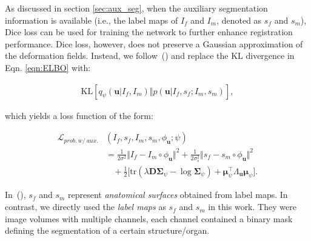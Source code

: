 \documentclass[times,twocolumn,final]{elsarticle}
\begin{document}
As discussed in section \ref{sec:aux_seg}, when the auxiliary segmentation information is available (i.e., the label maps of $I_f$ and $I_m$, denoted as $s_f$ and $s_m$), Dice loss can be used for training the network to further enhance registration performance. Dice loss, however, does not preserve a Gaussian approximation of the deformation fields. Instead, we follow~(\cite{dalca2019unsupervised}) and replace the KL divergence in Eqn. \ref{eqn:ELBO} with:
\begin{linenomath}
\begin{equation}
    \begin{split}
         \text{KL}\left[q_\psi(\mathbf{u}|I_f, I_m)\Vert p(\mathbf{u}|I_f, s_f; I_m, s_m)\right],
    \end{split}
\end{equation}
\end{linenomath}
which yields a loss function of the form:
\begin{linenomath}
\begin{equation}
\label{eqn:l_prob_w_seg_append}
    \begin{split}
        \mathcal{L}_{prob.\ w/\ aux.}&(I_f, s_f, I_m, s_m, \phi_\mathbf{u}; \psi)\\
        &=\frac{1}{2\sigma^2}\Vert I_f-I_m\circ\phi_\mathbf{u}\Vert^2+\frac{1}{2\sigma_s^2}\Vert s_f-s_m\circ\phi_\mathbf{u}\Vert^2\\
        &\ \ \ \ +\frac{1}{2}\Bigg[\text{tr}(\lambda\mathbf{D}\mathbf{\Sigma}_\psi-\log \mathbf{\Sigma}_\psi)+\mathbf{\mu}^\top_\psi\Lambda_\mathbf{u}\mathbf{\mu}_\psi\Bigg].
    \end{split}
\end{equation}
\end{linenomath}
In~(\cite{dalca2019unsupervised}), $s_f$ and $s_m$ represent \textit{anatomical surfaces} obtained from label maps. In contrast, we directly used the \textit{label maps} as $s_f$ and $s_m$ in this work. They were image volumes with multiple channels, each channel contained a binary mask defining the segmentation of a certain structure/organ.
\end{document}
